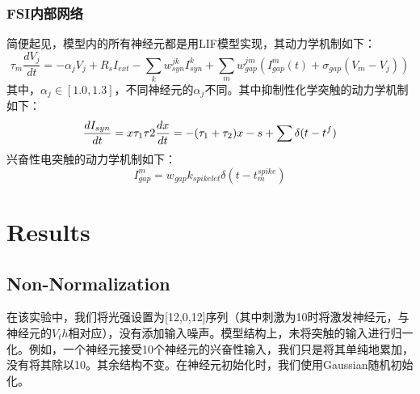 \documentclass[lang=cn,11pt,a4paper,cite=numbers]{elegantpaper}
\begin{document}
\subsubsection{FSI内部网络}
  简便起见，模型内的所有神经元都是用LIF模型实现，其动力学机制如下：
\begin{equation}
  \tau_{m}\frac{dV_{j}}{dt}=-\alpha_{j}V_{j}+R_{s}I_{ext}-\sum_{k}w_{syn}^{jk}I_{syn}^{k}+\sum_{m}w_{gap}^{jm}\left(I_{gap}^{m}(t)+\sigma_{gap}(V_{m}-V_{j})\right)
\end{equation}
其中，$\alpha_{j}\in[1.0,1.3]$，不同神经元的$\alpha_{j}$不同。其中抑制性化学突触的动力学机制如下：
\begin{equation}
  \frac{dI_{syn}}{dt}=x \\
  \tau_{1}\tau{2}\frac{dx}{dt}=-(\tau_{1}+\tau_{2})x-s+\sum\delta(t-t^{f})
\end{equation}
兴奋性电突触的动力学机制如下：
\begin{equation}
  I_{gap}^{m}=w_{gap}k_{spikelet}\delta\left(t-t_{m}^{spike}\right)
\end{equation}

\section{Results}
\subsection{Non-Normalization}
  在该实验中，我们将光强设置为[12,0,12]序列（其中刺激为10时将激发神经元，与神经元的$V_th$相对应），没有添加输入噪声。模型结构上，未将突触的输入进行归一化。例如，一个神经元接受10个神经元的兴奋性输入，我们只是将其单纯地累加，没有将其除以10。其余结构不变。在神经元初始化时，我们使用Gaussian随机初始化。
\end{document}
